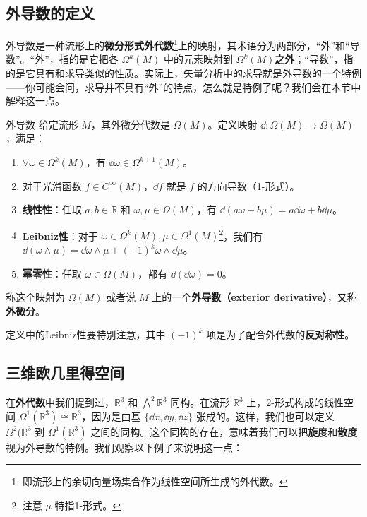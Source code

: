 

\subsection{外导数的定义}

外导数是一种流形上的\textbf{微分形式外代数}\footnote{即流形上的余切向量场集合作为线性空间所生成的外代数。}上的映射，其术语分为两部分，“外”和“导数”。“外”，指的是它把各 $\Omega^k(M)$ 中的元素映射到 $\Omega^k(M)$\textbf{之外}；“导数”，指的是它具有和求导类似的性质。实际上，矢量分析中的求导就是外导数的一个特例——你可能会问，求导并不具有“外”的特点，怎么就是特例了呢？我们会在本节中解释这一点。

\begin{definition}{外导数}\label{def_ExtDer_1}
给定流形 $M$，其外微分代数是 $\Omega (M)$。定义映射 $\dd:\Omega (M)\rightarrow\Omega (M)$，满足：
\begin{enumerate}
\item $\forall \omega\in\Omega^k(M)$，有 $\dd \omega\in\Omega^{k+1}(M)$。
\item 对于光滑函数 $f\in C^\infty(M)$，$\dd f$ 就是 $f$ 的方向导数（1-形式）。
\item \textbf{线性性}：任取 $a, b\in \mathbb{R}$ 和 $\omega, \mu\in\Omega(M)$，有 $\dd(a\omega+b\mu)=a\dd\omega+b\dd\mu$。
\item \textbf{Leibniz性}：对于 $\omega\in\Omega^k(M), \mu\in\Omega^1(M)$\footnote{注意 $\mu$ 特指1-形式。}，我们有 $\dd(\omega\wedge\mu)=\dd\omega\wedge\mu+(-1)^k\omega\wedge\dd\mu$。
\item \textbf{幂零性}：任取 $\omega\in\Omega(M)$，都有 $\dd(\dd\omega)=0$。
\end{enumerate}
称这个映射为 $\Omega (M)$ 或者说 $M$ 上的一个\textbf{外导数（exterior derivative）}，又称\textbf{外微分}。
\end{definition}

定义中的Leibniz性要特别注意，其中 $(-1)^k$ 项是为了配合外代数的\textbf{反对称性}。



\subsection{三维欧几里得空间}

在\textbf{外代数}中我们提到过，$\mathbb{R}^3$ 和 $\bigwedge^2\mathbb{R}^3$ 同构。在流形 $\mathbb{R}^3$ 上，2-形式构成的线性空间 $\Omega^1(\mathbb{R}^3)\cong\mathbb{R}^3$，因为是由基 $\{\dd x, \dd y, \dd z\}$ 张成的。这样，我们也可以定义 $\Omega^2(\mathbb{R}^3$ 到 $\Omega^1(\mathbb{R}^3)$ 之间的同构。这个同构的存在，意味着我们可以把\textbf{旋度}和\textbf{散度}视为外导数的特例。我们观察以下例子来说明这一点：

